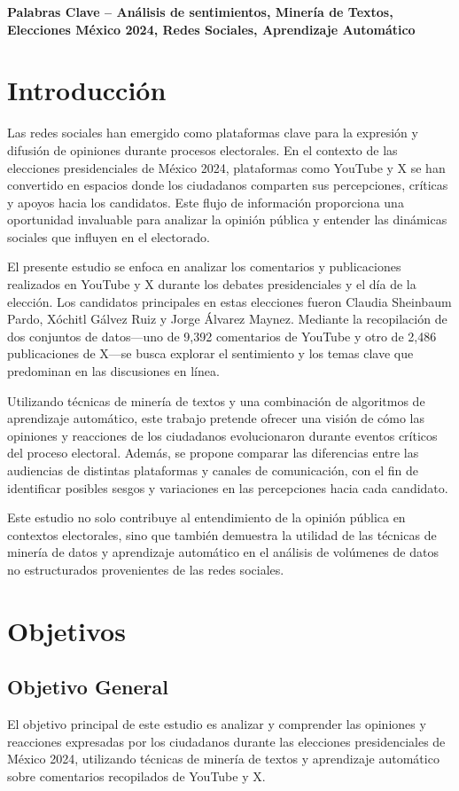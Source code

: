 \documentclass[10pt, a4paper]{article}
\begin{document}
	\textbf{Palabras Clave -- Análisis de sentimientos, Minería de Textos, Elecciones México 2024, Redes Sociales, Aprendizaje Automático}{\mykeywords}

	\section{Introducción}
    Las redes sociales han emergido como plataformas clave para la expresión y difusión de opiniones durante procesos electorales. En el contexto de las elecciones presidenciales de México 2024, plataformas como YouTube y X se han convertido en espacios donde los ciudadanos comparten sus percepciones, críticas y apoyos hacia los candidatos. Este flujo de información proporciona una oportunidad invaluable para analizar la opinión pública y entender las dinámicas sociales que influyen en el electorado.
    
    El presente estudio se enfoca en analizar los comentarios y publicaciones realizados en YouTube y X durante los debates presidenciales y el día de la elección. Los candidatos principales en estas elecciones fueron Claudia Sheinbaum Pardo, Xóchitl Gálvez Ruiz y Jorge Álvarez Maynez. Mediante la recopilación de dos conjuntos de datos—uno de 9,392 comentarios de YouTube y otro de 2,486 publicaciones de X—se busca explorar el sentimiento y los temas clave que predominan en las discusiones en línea.
    
    Utilizando técnicas de minería de textos y una combinación de algoritmos de aprendizaje automático, este trabajo pretende ofrecer una visión de cómo las opiniones y reacciones de los ciudadanos evolucionaron durante eventos críticos del proceso electoral. Además, se propone comparar las diferencias entre las audiencias de distintas plataformas y canales de comunicación, con el fin de identificar posibles sesgos y variaciones en las percepciones hacia cada candidato.
    
    Este estudio no solo contribuye al entendimiento de la opinión pública en contextos electorales, sino que también demuestra la utilidad de las técnicas de minería de datos y aprendizaje automático en el análisis de volúmenes de datos no estructurados provenientes de las redes sociales.
    
	\section{Objetivos}
    \subsection{Objetivo General}
    El objetivo principal de este estudio es analizar y comprender las opiniones y reacciones expresadas por los ciudadanos durante las elecciones presidenciales de México 2024, utilizando técnicas de minería de textos y aprendizaje automático sobre comentarios recopilados de YouTube y X. 
    
\end{document}
